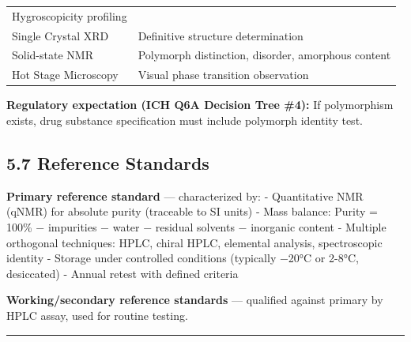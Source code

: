 \documentclass[
  11pt,
  a4paper,
]{report}
\begin{document}
\begin{longtable}[]{@{}ll@{}}
\begin{minipage}[t]{0.42\columnwidth}
Hygroscopicity profiling\strut
\end{minipage}\tabularnewline
\begin{minipage}[t]{0.52\columnwidth}\raggedright
Single Crystal XRD\strut
\end{minipage} & \begin{minipage}[t]{0.42\columnwidth}\raggedright
Definitive structure determination\strut
\end{minipage}\tabularnewline
\begin{minipage}[t]{0.52\columnwidth}\raggedright
Solid-state NMR\strut
\end{minipage} & \begin{minipage}[t]{0.42\columnwidth}\raggedright
Polymorph distinction, disorder, amorphous content\strut
\end{minipage}\tabularnewline
\begin{minipage}[t]{0.52\columnwidth}\raggedright
Hot Stage Microscopy\strut
\end{minipage} & \begin{minipage}[t]{0.42\columnwidth}\raggedright
Visual phase transition observation\strut
\end{minipage}\tabularnewline
\bottomrule
\end{longtable}

\textbf{Regulatory expectation (ICH Q6A Decision Tree \#4):} If
polymorphism exists, drug substance specification must include polymorph
identity test.

\hypertarget{reference-standards}{%
\subsection{5.7 Reference Standards}\label{reference-standards}}

\textbf{Primary reference standard} --- characterized by: - Quantitative
NMR (qNMR) for absolute purity (traceable to SI units) - Mass balance:
Purity = 100\% − impurities − water − residual solvents − inorganic
content - Multiple orthogonal techniques: HPLC, chiral HPLC, elemental
analysis, spectroscopic identity - Storage under controlled conditions
(typically −20°C or 2-8°C, desiccated) - Annual retest with defined
criteria

\textbf{Working/secondary reference standards} --- qualified against
primary by HPLC assay, used for routine testing.

\begin{center}\rule{0.5\linewidth}{0.5pt}\end{center}
\end{document}
